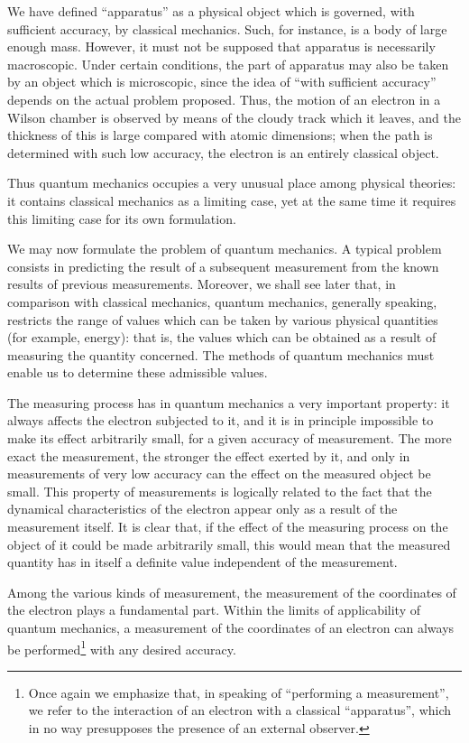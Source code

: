 We have defined “apparatus” as a physical object which is governed, with sufficient accuracy, by classical mechanics. Such, for instance, is a body of large enough mass. However, it must not be supposed that apparatus is necessarily macroscopic. Under certain conditions, the part of apparatus may also be taken by an object which is microscopic, since the idea of “with sufficient accuracy” depends on the actual problem proposed. Thus, the motion of an electron in a Wilson chamber is observed by means of the cloudy track which it leaves, and the thickness of this is large compared with atomic dimensions; when the path is determined with such low accuracy, the electron is an entirely classical object.


Thus quantum mechanics occupies a very unusual place among physical theories: it contains classical mechanics as a limiting case, yet at the same time it requires this limiting case for its own formulation.


We may now formulate the problem of quantum mechanics. A typical problem consists in predicting the result of a subsequent measurement from the known results of previous measurements. Moreover, we shall see later that, in comparison with classical mechanics, quantum mechanics, generally speaking, restricts the range of values which can be taken by various physical quantities (for example, energy): that is, the values which can be obtained as a result of measuring the quantity concerned. The methods of quantum mechanics must enable us to determine these admissible values.


The measuring process has in quantum mechanics a very important property: it always affects the electron subjected to it, and it is in principle impossible to make its effect arbitrarily small, for a given accuracy of measurement. The more exact the measurement, the stronger the effect exerted by it, and only in measurements of very low accuracy can the effect on the measured object be small. This property of measurements is logically related to the fact that the dynamical characteristics of the electron appear only as a result of the measurement itself. It is clear that, if the effect of the measuring process on the object of it could be made arbitrarily small, this would mean that the measured quantity has in itself a definite value independent of the measurement.


Among the various kinds of measurement, the measurement of the coordinates of the electron plays a fundamental part. Within the limits of applicability of quantum mechanics, a measurement of the coordinates of an electron can always be performed\footnote{Once again we emphasize that, in speaking of “performing a measurement”, we refer to the interaction of an electron with a classical “apparatus”, which in no way presupposes the presence of an external observer.
} with any desired accuracy.


